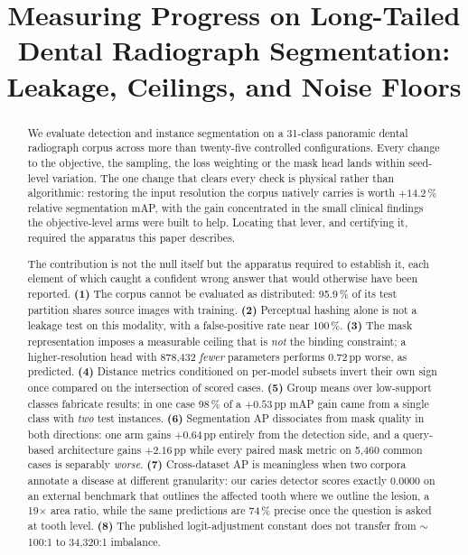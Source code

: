 \documentclass[10pt,twocolumn,letterpaper]{article}
\title{\vspace{-2em}\bfseries Measuring Progress on Long-Tailed Dental Radiograph
Segmentation: Leakage, Ceilings, and Noise Floors}
\author{}
\date{}
\begin{document}
\maketitle

\begin{abstract}
We evaluate detection and instance segmentation on a 31-class panoramic dental
radiograph corpus across more than twenty-five controlled configurations.
Every change to the objective, the sampling, the loss weighting or the mask
head lands within seed-level variation. The one change that clears every check
is physical rather than algorithmic: restoring the input resolution the corpus
natively carries is worth $+14.2$\,\% relative segmentation mAP, with the
gain concentrated in the small clinical findings the objective-level arms were
built to help. Locating that lever, and certifying it, required the apparatus
this paper describes.

The contribution is not the null itself but the apparatus required to establish
it, each element of which caught a confident wrong answer that would otherwise
have been reported. \textbf{(1)} The corpus cannot be evaluated as distributed:
95.9\,\% of its test partition shares source images with training. \textbf{(2)}
Perceptual hashing alone is not a leakage test on this modality, with a
false-positive rate near 100\,\%. \textbf{(3)} The mask representation imposes a
measurable ceiling that is \emph{not} the binding constraint; a
higher-resolution head with 878{,}432 \emph{fewer} parameters performs
0.72\,pp worse, as predicted. \textbf{(4)} Distance metrics conditioned on
per-model subsets invert their own sign once compared on the intersection of
scored cases. \textbf{(5)} Group means over low-support classes fabricate
results: in one case 98\,\% of a $+0.53$\,pp mAP gain came from a single class
with \emph{two} test instances. \textbf{(6)} Segmentation AP dissociates from mask
quality in both directions: one arm gains $+0.64$\,pp entirely from the
detection side, and a query-based architecture gains $+2.16$\,pp while every
paired mask metric on 5{,}460 common cases is separably \emph{worse}. \textbf{(7)} Cross-dataset AP is
meaningless when two corpora annotate a disease at different granularity: our
caries detector scores exactly 0.0000 on an external benchmark that outlines
the affected tooth where we outline the lesion, a 19$\times$ area ratio, while
the same predictions are 74\,\% precise once the question is asked at tooth
level. \textbf{(8)} The published logit-adjustment constant does not transfer
from $\sim$100:1 to 34{,}320:1 imbalance.


\end{abstract}
\end{document}
